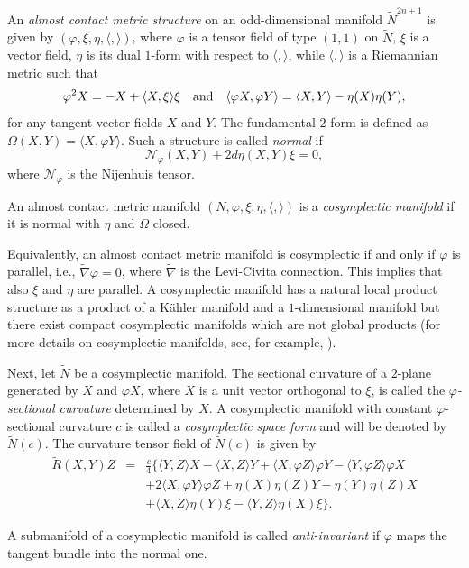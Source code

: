 \documentclass[11pt]{amsart}
\theoremstyle{plain}
\theoremstyle{definition}
\numberwithin{equation}{section}
\begin{document}
An \textit{almost contact metric structure} on an odd-dimensional manifold
$\tilde N^{2n+1}$ is given by $(\varphi,\xi,\eta,\langle,\rangle)$, where $\varphi$ is
a tensor field of type $(1,1)$ on $\tilde N$, $\xi$ is a vector field,
$\eta$ is its dual $1$-form with respect to $\langle,\rangle$, while $\langle,\rangle$ is a Riemannian metric such that
$$
\varphi^{2}X=-X+\langle X,\xi\rangle\xi\quad\textnormal{and}\quad
\langle\varphi X,\varphi Y\rangle=\langle X,Y\rangle-\eta(X)\eta(Y),
$$
for any tangent vector fields $X$ and $Y$. The fundamental $2$-form is defined as $\Omega(X,Y)=\langle X,\varphi Y\rangle$. Such a structure is
called {\it normal} if
$$
\mathcal N_{\varphi}(X,Y)+2d\eta(X,Y)\xi=0,
$$
where $\mathcal N_{\varphi}$ is the Nijenhuis tensor.

An almost contact metric manifold $(N,\varphi,\xi,\eta,\langle,\rangle)$ is a \textit{cosymplectic manifold} if it is normal with $\eta$ and $\Omega$ closed.

Equivalently, an almost contact metric manifold is cosymplectic if and only if $\varphi$ is parallel, i.e., $\tilde\nabla\varphi=0$, where $\tilde\nabla$ is the Levi-Civita connection. This implies that also $\xi$ and $\eta$ are parallel. A cosymplectic manifold has a natural local product structure as a product of a K\"ahler manifold and a $1$-dimensional manifold but there exist compact cosymplectic manifolds which are not global products (for more details on cosymplectic manifolds, see, for example, \cite{ABC,B,CdLM}). 

Next, let $\tilde N$ be a cosymplectic manifold. The
sectional curvature of a $2$-plane generated by $X$ and $\varphi X$,
where $X$ is a unit vector orthogonal to $\xi$, is called the
\textit{$\varphi$-sectional curvature} determined by $X$. A cosymplectic
manifold with constant $\varphi$-sectional curvature $c$ is called a
\textit{cosymplectic space form} and will be denoted by $\tilde N(c)$. The curvature
tensor field of $\tilde N(c)$ is given by
\begin{eqnarray}\label{eq:curv_product}
\tilde R(X,Y)Z&=&\frac{c}{4}\{\langle Y,Z\rangle X-\langle X,Z\rangle Y+\langle X,\varphi Z\rangle \varphi Y-\langle Y,\varphi Z\rangle\varphi X\\
\nonumber &&+2\langle X,\varphi Y\rangle\varphi Z+\eta(X)\eta(Z)Y-\eta(Y)\eta(Z)X\\\nonumber &&+\langle X,Z\rangle\eta(Y)\xi-\langle Y,Z\rangle\eta(X)\xi\}.
\end{eqnarray}

A submanifold of a cosymplectic manifold is called \textit{anti-invariant} if $\varphi$ maps the tangent bundle into the normal one.
\end{document}
